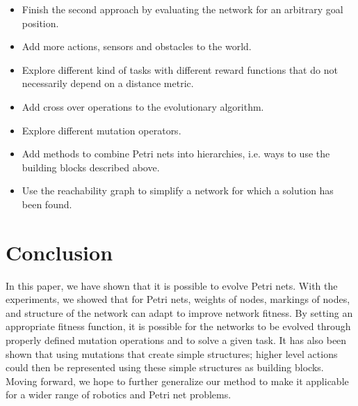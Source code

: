 \documentclass[12pt,a4paper,twocolumn]{article}
\begin{document}
\begin{itemize}
\item Finish the second approach by evaluating the network for an arbitrary goal position.
\item Add more actions, sensors and obstacles to the world.
\item Explore different kind of tasks with different reward functions that do not necessarily depend on a distance metric.
\item Add cross over operations to the evolutionary algorithm.
\item Explore different mutation operators.
\item Add methods to combine Petri nets into hierarchies, i.e. ways to use the building blocks described above.
\item Use the reachability graph to simplify a network for which a solution has been found.
\end{itemize}

\section{Conclusion}

In this paper, we have shown that it is possible to evolve Petri nets. With the experiments, we showed that for Petri nets, weights of nodes, markings of nodes, and structure of the network can adapt to improve network fitness. By setting an appropriate fitness function, it is possible for the networks to be evolved through properly defined mutation operations and to solve a given task. It has also been shown that using mutations that create simple structures; higher level actions could then be represented using these simple structures as building blocks. Moving forward, we hope to further generalize our method to make it applicable for a wider range of robotics and Petri net problems.



\end{document}
